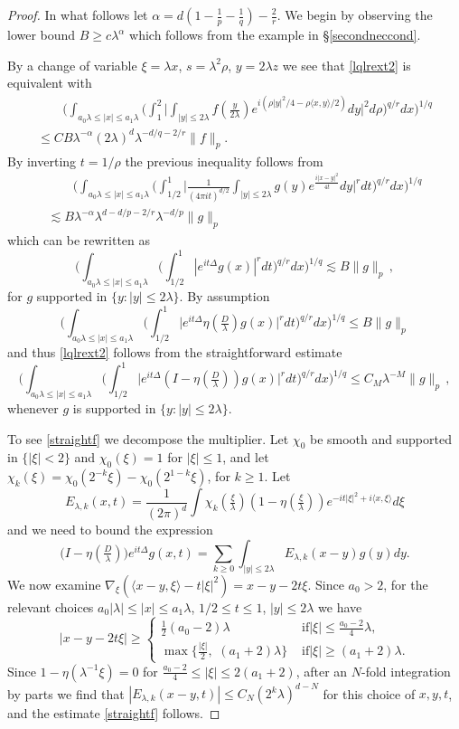\documentclass[11pt]{amsart}
\theoremstyle{definition}
\numberwithin{theorem}{section}
\numberwithin{definition}{section}
\numberwithin{equation}{section}
\def\inn#1#2{\langle#1,#2\rangle}
\newcommand{\Be}{\begin{equation}}
\newcommand{\Ee}{\end{equation}}
\renewcommand{\le}{\leqslant}
\renewcommand{\ge}{\geqslant}
\def\inn#1#2{\langle#1,#2\rangle}
\def\lc{\lesssim}
\def\la{\lambda}             \def\La{\Lambda}
\def\cB{{\mathcal {B}}}
\renewcommand{\le}{\leqslant}
\renewcommand{\ge}{\geqslant}
\begin{document}
\begin{proof}
In what follows let $\alpha= d(1-\frac 1p -\frac 1q)-\frac 2r$. We
begin by observing the lower bound $B\ge c \la^\alpha$ which follows
from the example in \S\ref{secondneccond}.


By a change of variable $\xi=\la x$, $ s = \la^2 \rho$, $y= 2\la z$
we see that
 \eqref{lqlrext2}  is equivalent with
\begin{multline*}
\qquad\Big(\int_{a_0\la\le |x|\le a_1\la}\Big(\int_1^2
\Big|\int_{|y|\le 2\la} f(\tfrac {y}{2\la})
e^{i(\rho|y|^2/4-\rho\inn xy/2)} dy\Big|^2  d\rho\Big)^{q/r}
dx\Big)^{1/q}
\\
\le CB\la^{-\alpha}(2\la)^d
 \la^{ -d/q-2/r}
\|f\|_p .\qquad
\end{multline*}
By inverting $t=1/\rho$ the previous inequality
follows from
\begin{multline*}
\qquad \Big(\int_{a_0\la\le |x|\le a_1\la}\Big(\int_{1/2}^1
\Big|\frac{1}{(4\pi i t)^{d/2}}\int_{|y|\le 2\la} g(y) e^{\frac{i|x-y|^2}{4t}}
dy\Big|^r  dt\Big)^{q/r} dx\Big)^{1/q}
\\
\lc B\la^{-\alpha} \la^{d-d/p-2/r}  \la^{-d/p}\|g\|_p \qquad
\end{multline*}
which can be rewritten as \Be \label{Ugbound}\Big(\int_{a_0\la\le
|x|\le a_1\la}\Big(\int_{1/2}^1 |e^{it\Delta}g(x)|^r
dt\Big)^{q/r} dx\Big)^{1/q} \lc B  \|g\|_p\,, \Ee for $g$ supported
in $\{y:|y|\le 2\la\}$. By assumption
$$\Big(\int_{a_0\la\le |x|\le a_1\la}\Big(\int_{1/2}^1
\Big| e^{it\Delta}\eta(\tfrac D\la )g(x) \Big|^r  dt\Big)^{q/r}
dx\Big)^{1/q} \le B \|g\|_p
$$
and  thus \eqref{lqlrext2} follows from the straightforward estimate
\Be\label{straightf} \Big(\int_{a_0\la\le |x|\le
a_1\la}\Big(\int_{1/2}^1 \Big|e^{it\Delta}(I-\eta(\tfrac D\la )) g(x)
\Big|^r  dt\Big)^{q/r} dx\Big)^{1/q} \le C_M \la^{-M} \|g\|_p\, ,
\Ee whenever $g$ is supported in $\{y:|y|\le 2\la\}$.


To see \eqref{straightf} we decompose the multiplier.
Let $\chi_0$ be smooth and supported in $\{|\xi|<2\}$ and $\chi_0(\xi)=1$ for $|\xi|\le 1$, and let
$\chi_k(\xi)=\chi_0(2^{-k}\xi)-\chi_0(2^{1-k}\xi)$, for $k\ge 1$. Let
$$E_{\la,k}(x,t)= \frac{1}{(2\pi)^d}\int \chi_k(\tfrac{\xi}{\la})(1-\eta(\tfrac{\xi}{\la})) e^{-it|\xi|^2+i\inn x\xi} d\xi %
$$
and  we need to bound
the expression
 $$\big(I-\eta(\tfrac D\la )\big)e^{it\Delta} g(x,t)=\sum_{k\ge 0} \int_{|y|\le 2\la} E_{\la,k}(x-y)
g(y) dy.$$
We now examine $\nabla_\xi(\inn {x-y}{\xi} -t|\xi|^2)= x-y-2t\xi $.
Since $a_0>2$,  for the relevant choices $a_0|\la|\le |x|\le
a_1\la$, $1/2\le t\le 1$, $|y|\le 2\la$ we have
$$| x-y-2t\xi|\ge \begin{cases} \frac 12(a_0-2)\la &\text{  if
$|\xi|\le \tfrac{a_0-2}{4}\la$, }
\\
\max\{ \tfrac{|\xi|}{2},\,\, (a_1+2)\la\}
&\text{  if
$|\xi|\ge (a_1+2)\la$.}\end{cases}
$$
Since
 $1-\eta(\la^{-1} \xi)=0$ for
$\frac{a_0-2}{4} \le |\xi|\le 2(a_1+2)$, after an $N$-fold
integration by  parts we find that $|E_{\la,k}(x-y,t) | \le
C_{N}(2^k\la)^{d-N}$ for this choice of $x,y,t$, and the estimate
\eqref{straightf} follows.
\end{proof}
\end{document}
